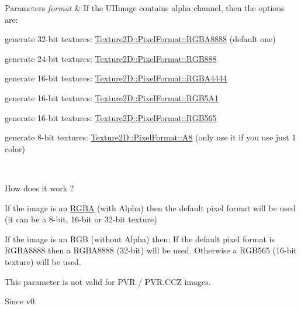 \begin{DoxyParams}{Parameters}
{\em format} & If the U\+I\+Image contains alpha channel, then the options are\+:
\begin{DoxyItemize}
\item generate 32-\/bit textures\+: \hyperlink{classTexture2D_a45d9d8bb5a0669def36bbdfbfb91d220a165f06116e7b8d9b2481dfc805db4619}{Texture2\+D\+::\+Pixel\+Format\+::\+R\+G\+B\+A8888} (default one)
\item generate 24-\/bit textures\+: \hyperlink{classTexture2D_a45d9d8bb5a0669def36bbdfbfb91d220a30ff380a3be74628024063a99fba10f0}{Texture2\+D\+::\+Pixel\+Format\+::\+R\+G\+B888}
\item generate 16-\/bit textures\+: \hyperlink{classTexture2D_a45d9d8bb5a0669def36bbdfbfb91d220a3660a3d64821411531dc60f54cee4f52}{Texture2\+D\+::\+Pixel\+Format\+::\+R\+G\+B\+A4444}
\item generate 16-\/bit textures\+: \hyperlink{classTexture2D_a45d9d8bb5a0669def36bbdfbfb91d220a145a041c8e2080c43fa129fb5b17d8be}{Texture2\+D\+::\+Pixel\+Format\+::\+R\+G\+B5\+A1}
\item generate 16-\/bit textures\+: \hyperlink{classTexture2D_a45d9d8bb5a0669def36bbdfbfb91d220a3b73e4d15701467ed72f157ffaff680a}{Texture2\+D\+::\+Pixel\+Format\+::\+R\+G\+B565}
\item generate 8-\/bit textures\+: \hyperlink{classTexture2D_a45d9d8bb5a0669def36bbdfbfb91d220afd301d675be7b677ba979a430a80c010}{Texture2\+D\+::\+Pixel\+Format\+::\+A8} (only use it if you use just 1 color)
\end{DoxyItemize}\\
\hline
\end{DoxyParams}
How does it work ?
\begin{DoxyItemize}
\item If the image is an \hyperlink{structRGBA}{R\+G\+BA} (with Alpha) then the default pixel format will be used (it can be a 8-\/bit, 16-\/bit or 32-\/bit texture)
\item If the image is an R\+GB (without Alpha) then\+: If the default pixel format is R\+G\+B\+A8888 then a R\+G\+B\+A8888 (32-\/bit) will be used. Otherwise a R\+G\+B565 (16-\/bit texture) will be used.
\end{DoxyItemize}

This parameter is not valid for P\+VR / P\+V\+R.\+C\+CZ images.

\begin{DoxySince}{Since}
v0. 
\end{DoxySince}
\mbox{\label{classTexture2D_ab1e3f2bdc255d893dfc6ad541ceb29c0}} 
